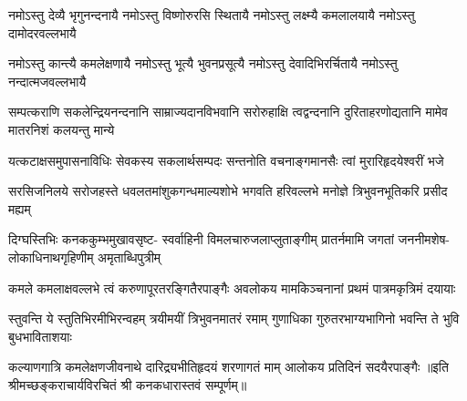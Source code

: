 \fourlineindentedshloka
{नमोऽस्तु देव्यै भृगुनन्दनायै}
{नमोऽस्तु विष्णोरुरसि स्थितायै}
{नमोऽस्तु लक्ष्म्यै कमलालयायै}
{नमोऽस्तु दामोदरवल्लभायै}

\fourlineindentedshloka
{नमोऽस्तु कान्त्यै कमलेक्षणायै}
{नमोऽस्तु भूत्यै भुवनप्रसूत्यै}
{नमोऽस्तु देवादिभिरर्चितायै}
{नमोऽस्तु नन्दात्मजवल्लभायै}

\fourlineindentedshloka
{सम्पत्कराणि सकलेन्द्रियनन्दनानि}
{साम्राज्यदानविभवानि सरोरुहाक्षि}
{त्वद्वन्दनानि दुरिताहरणोद्यतानि}
{मामेव मातरनिशं कलयन्तु मान्ये}

\fourlineindentedshloka
{यत्कटाक्षसमुपासनाविधिः}
{सेवकस्य सकलार्थसम्पदः}
{सन्तनोति वचनाङ्गमानसैः}
{त्वां मुरारिहृदयेश्वरीं भजे}

\fourlineindentedshloka
{सरसिजनिलये सरोजहस्ते}
{धवलतमांशुकगन्धमाल्यशोभे}
{भगवति हरिवल्लभे मनोज्ञे}
{त्रिभुवनभूतिकरि प्रसीद मह्यम्}

\fourlineindentedshloka
{दिग्घस्तिभिः कनककुम्भमुखावसृष्ट-}
{स्वर्वाहिनी विमलचारुजलाप्लुताङ्गीम्}
{प्रातर्नमामि जगतां जननीमशेष-}
{लोकाधिनाथगृहिणीम् अमृताब्धिपुत्रीम्}

\fourlineindentedshloka
{कमले कमलाक्षवल्लभे त्वं}
{करुणापूरतरङ्गितैरपाङ्गैः}
{अवलोकय मामकिञ्चनानां}
{प्रथमं पात्रमकृत्रिमं दयायाः}

\fourlineindentedshloka
{स्तुवन्ति ये स्तुतिभिरमीभिरन्वहम्}
{त्रयीमयीं त्रिभुवनमातरं रमाम्}
{गुणाधिका गुरुतरभाग्यभागिनो}
{भवन्ति ते भुवि बुधभाविताशयाः}

{कल्याणगात्रि कमलेक्षणजीवनाथे}
{दारिद्र्यभीतिहृदयं शरणागतं माम्}
{आलोकय प्रतिदिनं सदयैरपाङ्गैः}
॥इति  श्रीमच्छङ्कराचार्यविरचितं श्री कनकधारास्तवं सम्पूर्णम्॥